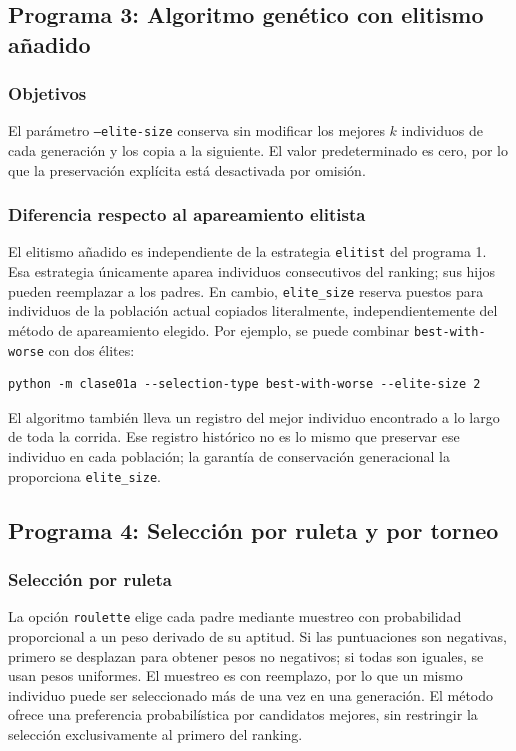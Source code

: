 \documentclass[12pt,a4paper]{article}
\begin{document}
\subsection{Programa 3: Algoritmo genético con elitismo añadido}

\subsubsection{Objetivos}

El parámetro \texttt{--elite-size} conserva sin modificar los mejores
\(k\) individuos de cada generación y los copia a la siguiente. El valor
predeterminado es cero, por lo que la preservación explícita está desactivada
por omisión.

\subsubsection{Diferencia respecto al apareamiento elitista}

El elitismo añadido es independiente de la estrategia \texttt{elitist} del
programa 1. Esa estrategia únicamente aparea individuos consecutivos del
ranking; sus hijos pueden reemplazar a los padres. En cambio,
\texttt{elite\_size} reserva puestos para individuos de la población actual
copiados literalmente, independientemente del método de apareamiento elegido.
Por ejemplo, se puede combinar \texttt{best-with-worse} con dos élites:

\begin{verbatim}
python -m clase01a --selection-type best-with-worse --elite-size 2
\end{verbatim}

El algoritmo también lleva un registro del mejor individuo encontrado a lo
largo de toda la corrida. Ese registro histórico no es lo mismo que preservar
ese individuo en cada población; la garantía de conservación generacional la
proporciona \texttt{elite\_size}.

\subsection{Programa 4: Selección por ruleta y por torneo}

\subsubsection{Selección por ruleta}

La opción \texttt{roulette} elige cada padre mediante muestreo con probabilidad
proporcional a un peso derivado de su aptitud. Si las puntuaciones son
negativas, primero se desplazan para obtener pesos no negativos; si todas son
iguales, se usan pesos uniformes. El muestreo es con reemplazo, por lo que un
mismo individuo puede ser seleccionado más de una vez en una generación. El
método ofrece una preferencia probabilística por candidatos mejores, sin
restringir la selección exclusivamente al primero del ranking.
\end{document}
